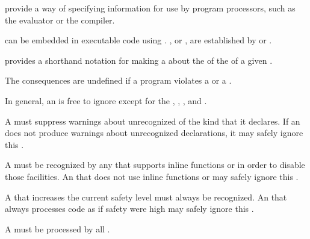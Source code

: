 
 provide a way of specifying information for use by
program processors, such as the evaluator or the compiler.

can be embedded in executable code using .
, 
or ,
are established by  or .

 provides a shorthand notation for 
making a  about the  of the
 of a given .

The consequences are undefined if a program violates a 
or a .


In general, an  is free to ignore
 except for the
     ,
     ,
     ,
 and  .

A   must suppress warnings
about unrecognized  of the kind that it declares.
If an  does not produce warnings about
unrecognized declarations, it may safely ignore this .

A   must be recognized by any 
that supports inline functions or  in order to disable those facilities.
An  that does not use inline functions or 
may safely ignore this .

A   that increases the current safety level 
must always be recognized.  An  that always processes 
code as if safety were high may safely ignore this .

A   must be processed by all .

\endSubsection%

